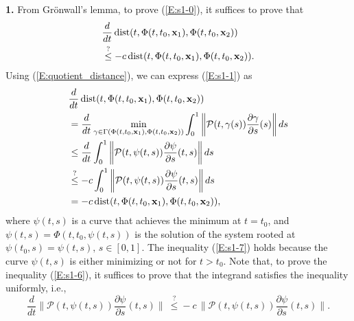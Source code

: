 \noindent \textbf{1.} From Gr\"onwall's lemma, to prove (\ref{E:s1-0}), it suffices to prove that
\begin{align}
    &\frac{d}{d t} \operatorname*{dist}(t, \Phi(t, t_0, \mathbf{x}_1), \Phi(t, t_0, \mathbf{x}_2)) \notag \\
    &\overset{?}{\leq} -c \operatorname*{dist}(t, \Phi(t, t_0, \mathbf{x}_1), \Phi(t, t_0, \mathbf{x}_2)). \label{E:s1-1}
\end{align}
Using (\ref{E:quotient_distance}), we can express (\ref{E:s1-1}) as
\begin{align}
    &\frac{d}{d t} \operatorname*{dist}(t, \Phi(t, t_0, \mathbf{x}_1), \Phi(t, t_0, \mathbf{x}_2)) \notag \\
    &= \frac{d}{d t} \min_{\gamma \in \Gamma(\Phi(t, t_0, \mathbf{x}_1), \Phi(t, t_0, \mathbf{x}_2))} \int_0^1 \bigg\|\mathcal P(t, \gamma(s)) \frac{\partial\gamma}{\partial s}(s) \bigg\|\, ds \notag \\
    &\leq \frac{d}{d t} \int_0^1 \bigg\|\mathcal P(t, \psi(t, s)) \frac{\partial\psi}{\partial s}(t, s) \bigg\|\, ds \label{E:s1-7} \\
    &\overset{?}{\leq} -c \int_0^1 \bigg\|\mathcal P(t, \psi(t, s)) \frac{\partial\psi}{\partial s}(t, s) \bigg\|\, ds \label{E:s1-6} \\
    &= {-}c \operatorname*{dist}(t, \Phi(t, t_0, \mathbf{x}_1), \Phi(t, t_0, \mathbf{x}_2)), \notag 
\end{align}
where $\psi(t, s)$ is a curve that achieves the minimum at $t = t_0$, and $\psi(t, s) = \Phi(t, t_0, \psi(t, s))$ is the solution of the system rooted at $\psi(t_0, s) = \psi(t, s),\, s\in [0, 1]$. The inequality (\ref{E:s1-7}) holds because the curve $\psi(t, s)$ is either minimizing or not for $t > t_0$. Note that, to prove the inequality (\ref{E:s1-6}), it suffices to prove that the integrand satisfies the inequality uniformly, i.e.,
\begin{equation} \label{E:s1-8}
    \frac{d}{d t} \bigg\|\mathcal P(t, \psi(t, s)) \frac{\partial\psi}{\partial s}(t, s) \bigg\|\ \overset{?}{\leq} -c\, \bigg\|\mathcal P(t, \psi(t, s)) \frac{\partial\psi}{\partial s}(t, s) \bigg\|.
\end{equation}
